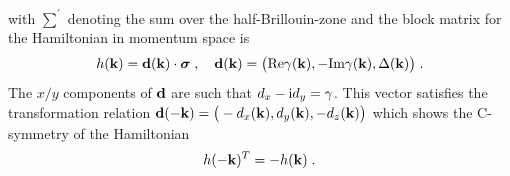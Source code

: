 with $\sum^{\prime}$ denoting the sum over the half-Brillouin-zone and the block matrix for the Hamiltonian in momentum space is
\begin{equation}
    h(\mathbf{k}) = \mathbf{d}(\mathbf{k})\cdot \bm{\sigma} \; , \quad
    \mathbf{d}(\mathbf{k}) = \big(\text{Re}\gamma(\mathbf{k}), -\text{Im}\gamma(\mathbf{k}), \Delta(\mathbf{k}) \big) \; .
\end{equation}
The $x/y$ components of $\mathbf{d}$ are such that $d_x - \mathrm{i} d_y=\gamma$. This vector satisfies the transformation relation $\mathbf{d}(-\mathbf{k}) = \big(-d_x(\mathbf{k}),d_y(\mathbf{k}),-d_z(\mathbf{k}) \big)$ which shows the C-symmetry of the Hamiltonian
\begin{equation}
    h(-\mathbf{k})^T = - h(\mathbf{k}) \; .
\end{equation}



